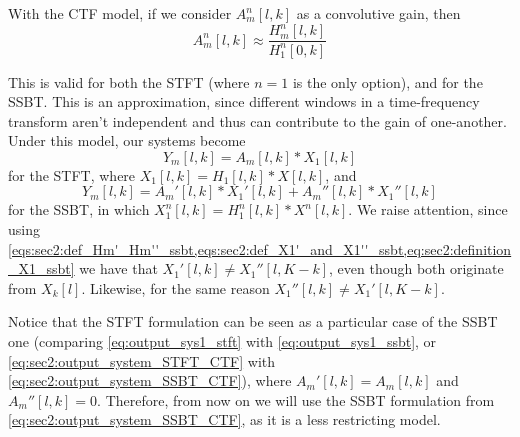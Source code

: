 With the CTF model, if we consider $A^n_m[l,k]$ as a convolutive gain, then
\begin{equation}
	A^n_m[l,k] \approx \frac{H^n_m[l,k]}{H^n_1[0,k]}
\end{equation}

This is valid for both the STFT (where $n = 1$ is the only option), and for the SSBT. This is an approximation, since different windows in a time-frequency transform aren't independent and thus can contribute to the gain of one-another. Under this model, our systems become
\begin{equation}
	\label{eq:sec2:output_system_STFT_CTF}
	Y_m[l,k] = A_m[l,k] \ast X_1[l,k]
\end{equation}
for the STFT, where $X_1[l,k] = H_1[l,k] \ast X[l,k]$, and
\begin{equation}
	\label{eq:sec2:output_system_SSBT_CTF}
	Y_m[l,k] = A_m'[l,k] \ast X_1'[l,k] + A_m''[l,k] \ast X_1''[l,k]
\end{equation}
for the SSBT, in which $X_1^n[l,k] = H_1^n[l,k] \ast X^n[l,k]$. We raise attention, since using \cref{eqs:sec2:def_Hm'_Hm''_ssbt,eqs:sec2:def_X1'_and_X1''_ssbt,eq:sec2:definition_X1_ssbt} we have that $X_{1}'[l,k] \neq X_{1}''[l,K-k]$, even though both originate from $X_k[l]$. Likewise, for the same reason $X_{1}''[l,k] \neq X_{1}'[l,K-k]$.

Notice that the STFT formulation can be seen as a particular case of the SSBT one (comparing \cref{eq:output_sys1_stft} with \cref{eq:output_sys1_ssbt}, or \cref{eq:sec2:output_system_STFT_CTF} with \cref{eq:sec2:output_system_SSBT_CTF}), where $A_{m}'[l,k] = A_{m}[l,k]$ and $A_{m}''[l,k] = 0$. Therefore, from now on we will use the SSBT formulation from \cref{eq:sec2:output_system_SSBT_CTF}, as it is a less restricting model.